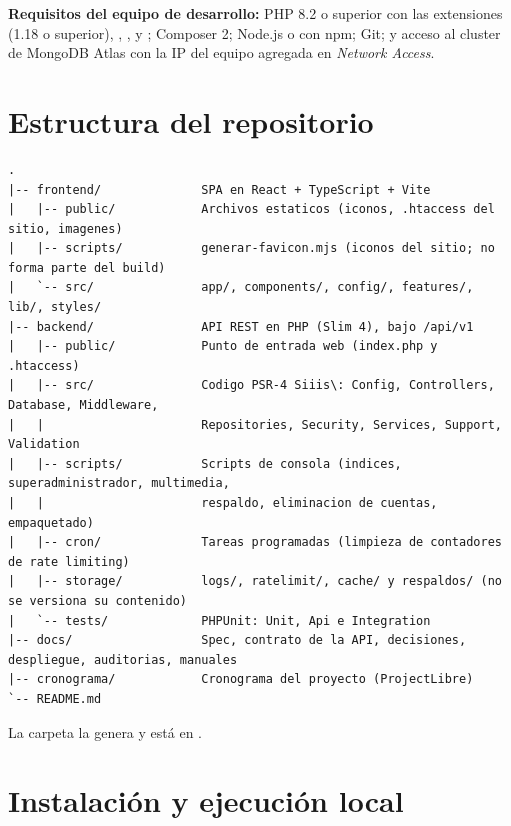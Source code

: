 \documentclass[11pt,a4paper]{article}
\begin{document}
\textbf{Requisitos del equipo de desarrollo:} PHP 8.2 o superior con las extensiones  (1.18 o superior),
, ,  y ; Composer 2; Node.js  o 
con npm; Git; y acceso al cluster de MongoDB Atlas con la IP del equipo agregada en \emph{Network Access}.

\section{Estructura del repositorio}

\begin{lstlisting}[style=texto]
.
|-- frontend/              SPA en React + TypeScript + Vite
|   |-- public/            Archivos estaticos (iconos, .htaccess del sitio, imagenes)
|   |-- scripts/           generar-favicon.mjs (iconos del sitio; no forma parte del build)
|   `-- src/               app/, components/, config/, features/, lib/, styles/
|-- backend/               API REST en PHP (Slim 4), bajo /api/v1
|   |-- public/            Punto de entrada web (index.php y .htaccess)
|   |-- src/               Codigo PSR-4 Siiis\: Config, Controllers, Database, Middleware,
|   |                      Repositories, Security, Services, Support, Validation
|   |-- scripts/           Scripts de consola (indices, superadministrador, multimedia,
|   |                      respaldo, eliminacion de cuentas, empaquetado)
|   |-- cron/              Tareas programadas (limpieza de contadores de rate limiting)
|   |-- storage/           logs/, ratelimit/, cache/ y respaldos/ (no se versiona su contenido)
|   `-- tests/             PHPUnit: Unit, Api e Integration
|-- docs/                  Spec, contrato de la API, decisiones, despliegue, auditorias, manuales
|-- cronograma/            Cronograma del proyecto (ProjectLibre)
`-- README.md
\end{lstlisting}

La carpeta  la genera  y est\'a en .

\section{Instalaci\'on y ejecuci\'on local}
\end{document}
